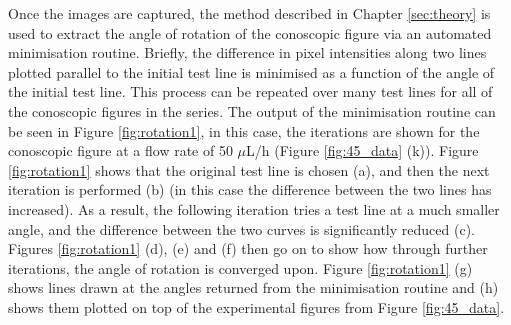 Once the images are captured, the method described in Chapter \ref{sec:theory} is used to extract the angle of rotation of the conoscopic figure via an automated minimisation routine. Briefly, the difference in pixel intensities along two lines plotted parallel to the initial test line is minimised as a function of the angle of the initial test line. This process can be repeated over many test lines for all of the conoscopic figures in the series. The output of the minimisation routine can be seen in Figure \ref{fig:rotation1}, in this case, the iterations are shown for the conoscopic figure at a flow rate of 50 $\mu$L/h (Figure \ref{fig:45_data} (k)). Figure \ref{fig:rotation1} shows that the original test line is chosen (a), and then the next iteration is performed (b) (in this case the difference between the two lines has increased). As a result, the following iteration tries a test line at a much smaller angle, and the difference between the two curves is significantly reduced (c). Figures \ref{fig:rotation1} (d), (e) and (f) then go on to show how through further iterations, the angle of rotation is converged upon. Figure \ref{fig:rotation1} (g) shows lines drawn at the angles returned from the minimisation routine and (h) shows them plotted on top of the experimental figures from Figure \ref{fig:45_data}.

